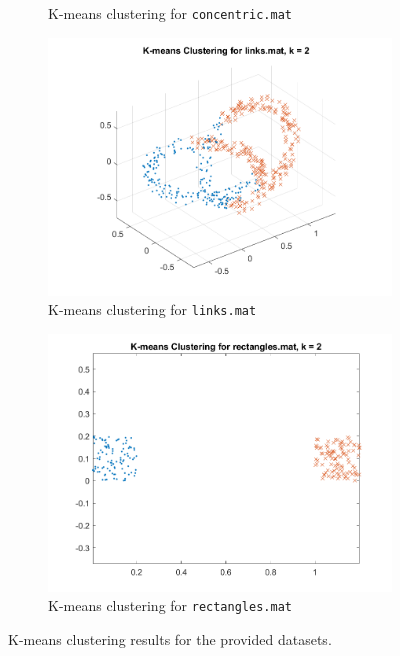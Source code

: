 \documentclass[11pt]{article}
\begin{document}
\begin{figure}[!ht]
\begin{subfigure}{0.45\textwidth}
        \caption{K-means clustering for \texttt{concentric.mat}}
    \end{subfigure}
    \begin{subfigure}{0.45\textwidth}
        \includegraphics[width=\linewidth]{k_means_clustering_links.mat.png}
        \caption{K-means clustering for \texttt{links.mat}}
    \end{subfigure}
    \begin{subfigure}{0.45\textwidth}
        \includegraphics[width=\linewidth]{k_means_clustering_rectangles.mat.png}
        \caption{K-means clustering for \texttt{rectangles.mat}}
    \end{subfigure}
    \caption{K-means clustering results for the provided datasets.}
    \label{fig:kmeans}
\end{figure}
\end{document}
